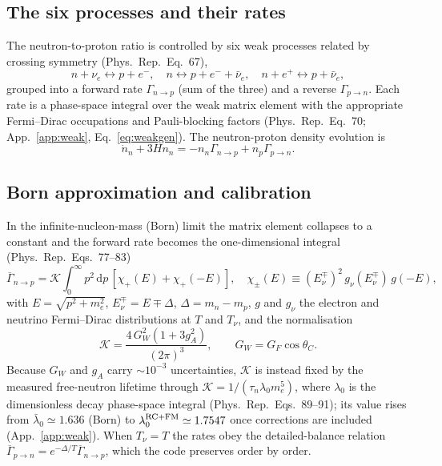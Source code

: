 \documentclass[11pt,a4paper]{article}
\newcommand{\dd}{\mathrm{d}}
\newcommand{\Tnu}{T_\nu}
\newcommand{\PR}{Phys.\ Rep.}
\newcommand{\Gap}{\Delta}
\newcommand{\Kw}{\mathcal{K}}
\begin{document}
\subsection{The six processes and their rates}
The neutron-to-proton ratio is controlled by six weak processes related by
crossing symmetry (\PR\ Eq.~67),
\begin{equation}
  n+\nu_e \leftrightarrow p+e^-, \quad
  n \leftrightarrow p+e^-+\bar\nu_e, \quad
  n+e^+ \leftrightarrow p+\bar\nu_e,
\label{eq:sixprocesses}
\end{equation}
grouped into a forward rate $\Gamma_{n\to p}$ (sum of the three) and a reverse
$\Gamma_{p\to n}$. Each rate is a phase-space integral over the weak matrix
element with the appropriate Fermi--Dirac occupations and Pauli-blocking factors
(\PR\ Eq.~70; App.~\ref{app:weak}, Eq.~\eqref{eq:weakgen}). The neutron-proton
density evolution is
\begin{equation}
  \dot n_n + 3Hn_n = -n_n\Gamma_{n\to p} + n_p\Gamma_{p\to n}.
\end{equation}

\subsection{Born approximation and calibration}
In the infinite-nucleon-mass (Born) limit the matrix element collapses to a
constant and the forward rate becomes the one-dimensional integral (\PR\
Eqs.~77--83)
\begin{equation}
  \overline\Gamma_{n\to p} = \Kw\!\int_0^\infty\! p^2\,\dd p\,
     \left[\chi_+(E)+\chi_+(-E)\right],
  \quad
  \chi_\pm(E)\equiv (E_\nu^\mp)^2\,g_\nu(E_\nu^\mp)\,g(-E),
\label{eq:born}
\end{equation}
with $E=\sqrt{p^2+m_e^2}$, $E_\nu^\mp=E\mp\Gap$, $\Gap=m_n-m_p$, $g$ and $g_\nu$
the electron and neutrino Fermi--Dirac distributions at $T$ and $\Tnu$, and the
normalisation
\begin{equation}
  \Kw = \frac{4\,G_W^2(1+3g_A^2)}{(2\pi)^3}, \qquad G_W = G_F\cos\theta_C .
\label{eq:K}
\end{equation}
Because $G_W$ and $g_A$ carry $\sim\!10^{-3}$ uncertainties, $\Kw$ is instead
fixed by the measured free-neutron lifetime through $\Kw=1/(\tau_n\lambda_0
m_e^5)$, where $\lambda_0$ is the dimensionless decay phase-space integral (\PR\
Eqs.~89--91); its value rises from $\bar\lambda_0\simeq1.636$ (Born) to
$\lambda_0^{\rm RC+FM}\simeq1.7547$ once corrections are included
(App.~\ref{app:weak}). When $\Tnu=T$ the rates obey the detailed-balance
relation $\overline\Gamma_{p\to n}=e^{-\Gap/T}\overline\Gamma_{n\to p}$, which
the code preserves order by order.
\end{document}
